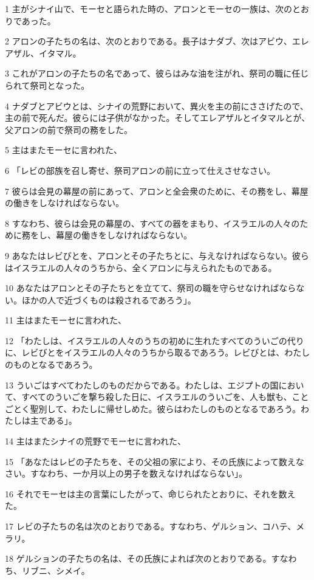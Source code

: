 \par 1 主がシナイ山で、モーセと語られた時の、アロンとモーセの一族は、次のとおりであった。
\par 2 アロンの子たちの名は、次のとおりである。長子はナダブ、次はアビウ、エレアザル、イタマル。
\par 3 これがアロンの子たちの名であって、彼らはみな油を注がれ、祭司の職に任じられて祭司となった。
\par 4 ナダブとアビウとは、シナイの荒野において、異火を主の前にささげたので、主の前で死んだ。彼らには子供がなかった。そしてエレアザルとイタマルとが、父アロンの前で祭司の務をした。
\par 5 主はまたモーセに言われた、
\par 6 「レビの部族を召し寄せ、祭司アロンの前に立って仕えさせなさい。
\par 7 彼らは会見の幕屋の前にあって、アロンと全会衆のために、その務をし、幕屋の働きをしなければならない。
\par 8 すなわち、彼らは会見の幕屋の、すべての器をまもり、イスラエルの人々のために務をし、幕屋の働きをしなければならない。
\par 9 あなたはレビびとを、アロンとその子たちとに、与えなければならない。彼らはイスラエルの人々のうちから、全くアロンに与えられたものである。
\par 10 あなたはアロンとその子たちとを立てて、祭司の職を守らせなければならない。ほかの人で近づくものは殺されるであろう」。
\par 11 主はまたモーセに言われた、
\par 12 「わたしは、イスラエルの人々のうちの初めに生れたすべてのういごの代りに、レビびとをイスラエルの人々のうちから取るであろう。レビびとは、わたしのものとなるであろう。
\par 13 ういごはすべてわたしのものだからである。わたしは、エジプトの国において、すべてのういごを撃ち殺した日に、イスラエルのういごを、人も獣も、ことごとく聖別して、わたしに帰せしめた。彼らはわたしのものとなるであろう。わたしは主である」。
\par 14 主はまたシナイの荒野でモーセに言われた、
\par 15 「あなたはレビの子たちを、その父祖の家により、その氏族によって数えなさい。すなわち、一か月以上の男子を数えなければならない」。
\par 16 それでモーセは主の言葉にしたがって、命じられたとおりに、それを数えた。
\par 17 レビの子たちの名は次のとおりである。すなわち、ゲルション、コハテ、メラリ。
\par 18 ゲルションの子たちの名は、その氏族によれば次のとおりである。すなわち、リブニ、シメイ。
